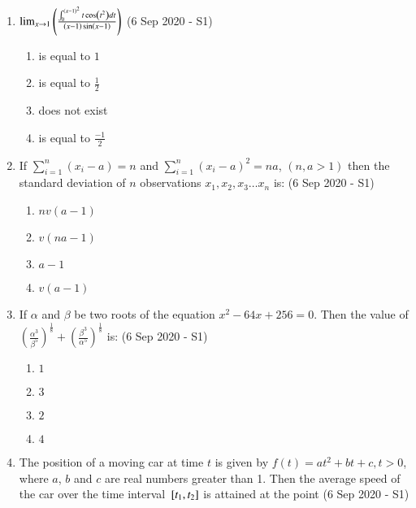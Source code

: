 \documentclass[journal]{IEEEtran}
\begin{document}
\begin{enumerate}
    \item $\lim_{x \rightarrow 1} \left(\frac{\int_{0}^{\left(x-1\right)^2} t \cos \left(t^2\right) dt}{\left(x-1\right)\sin\left(x-1\right)}\right)$ \hfill (6 Sep 2020 - S1)
    
    \begin{multicols}{4}
    \begin{enumerate}
        \item is equal to $1$
        \item is equal to $\frac{1}{2}$
        \item does not exist
        \item is equal to $\frac{-1}{2}$
    \end{enumerate}
    \end{multicols}
    
    \item If $\sum_{i=1}^{n}(x_i - a) = n$ and $\sum_{i=1}^{n} (x_i - a)^2 = na$, $(n,a >1)$ then the standard deviation of $n$ observations $x_1, x_2, x_3\ldots x_n$ is: \hfill (6 Sep 2020 - S1)
    
    \begin{multicols}{4}
    \begin{enumerate}
        \item $nv(a-1)$
        \item $v(na-1)$
        \item $a-1$
        \item $v(a-1)$
    \end{enumerate}
    \end{multicols}
    
    \item If $\alpha$ and $\beta$ be two roots of the equation $x^2 -64x+256 = 0$. Then the value of $(\frac{\alpha^3}{\beta^5})^\frac{1}{8}+(\frac{\beta^3}{\alpha^5})^\frac{1}{8}$ is: \hfill (6 Sep 2020 - S1)

    \begin{multicols}{4}
    \begin{enumerate}
        \item $1$
        \item $3$
        \item $2$
        \item $4$
    \end{enumerate}
    \end{multicols}
    
    \item The position of a moving car at time $t$ is given by $f(t) = at^2+bt+c, t > 0$, where $a$, $b$ and $c$ are real numbers greater than 1. Then the average speed of the car over the time interval ${}\left[t_1, t_2\right]$ is attained at the point \hfill (6 Sep 2020 - S1)


\end{enumerate}
\end{document}
